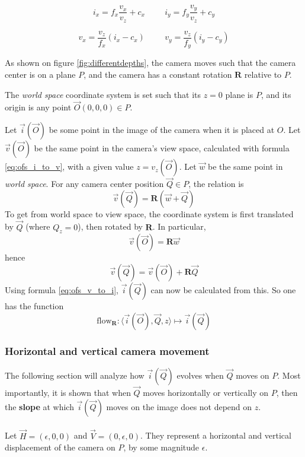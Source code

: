 \documentclass[11pt]{scrreprt}
\newcommand{\matr}[1]{\mathbf{#1}}
\begin{document}
\begin{equation}
\label{eq:ofs_v_to_i}
i_x = f_x \frac{v_x}{v_z} + c_x
\hspace{1cm}
i_y = f_y \frac{v_y}{v_z} + c_y
\end{equation}

\begin{equation}
\label{eq:ofs_i_to_v}
v_x = \frac{v_z}{f_x} (i_x - c_x)
\hspace{1cm}
v_y = \frac{v_z}{f_y} (i_y - c_y)
\end{equation}

As shown on figure \ref{fig:differentdepths}, the camera moves such that the camera center is on a plane $P$, and the camera has a constant rotation $\matr{R}$ relative to $P$.

The \emph{world space} coordinate system is set such that its $z = 0$ plane is $P$, and its origin is any point $\vec{O}(0,0,0) \in P$.

Let $\vec{i}(\vec{O})$ be some point in the image of the camera when it is placed at $O$. Let $\vec{v}(\vec{O})$ be the same point in the camera's view space, calculated with formula \ref{eq:ofs_i_to_v}, with a given value $z = v_z(\vec{O})$. Let $\vec{w}$ be the same point in \emph{world space}. For any camera center position $\vec{Q} \in P$, the relation is
\begin{equation}
\vec{v}(\vec{Q}) = \matr{R} (\vec{w} + \vec{Q})
\end{equation}
To get from world space to view space, the coordinate system is first translated by $\vec{Q}$ (where $Q_z = 0$), then rotated by $\matr{R}$. In particular,
\begin{equation}
\vec{v}(\vec{O}) = \matr{R} \vec{w}
\end{equation}
hence
\begin{equation}
\vec{v}(\vec{Q}) = \vec{v}(\vec{O}) + \matr{R} \vec{Q}
\end{equation}
Using formula \ref{eq:ofs_v_to_i}, $\vec{i}(\vec{Q})$ can now be calculated from this. So one has the function
\begin{equation}
\text{flow}_{\matr{R}} : \langle \vec{i}(\vec{O}), \vec{Q}, z \rangle \mapsto \vec{i}(\vec{Q})
\end{equation} 

\subsubsection{Horizontal and vertical camera movement}
The following section will analyze how $\vec{i}(\vec{Q})$ evolves when $\vec{Q}$ moves on $P$. Most importantly, it is shown that when $\vec{Q}$ moves horizontally or vertically on $P$, then the \textbf{slope} at which $\vec{i}(\vec{Q})$ moves on the image does not depend on $z$.
\\ \\
Let $\vec{H} = (\epsilon,0,0)$ and $\vec{V} = (0,\epsilon,0)$. They represent a horizontal and vertical displacement of the camera on $P$, by some magnitude $\epsilon$.
\end{document}
